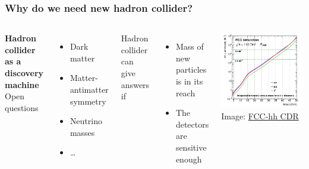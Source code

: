 \documentclass[aspectratio=169]{beamer}
\newcommand{\bluetext}[1]{%
  \textcolor{myBlue}{#1}
}
\begin{document}
\begin{frame}
  \frametitle{Why do we need new hadron collider?}

  \begin{columns}[c]

    \bluetext{{\bf Hadron collider as a discovery machine}}\\

    \bluetext{Open questions}
    \begin{itemize}
      \item Dark matter
      \item Matter-antimatter symmetry
      \item Neutrino masses
      \item \dots
    \end{itemize}
    \pause%

    \bluetext{Hadron collider can give answers if}
    \begin{itemize}
      \item Mass of new particles is in its reach
      \item The detectors are sensitive enough
    \end{itemize}


    \includegraphics[width=\linewidth]{figures/zprime-search-fcchh.png} \\
    \tiny{Image: \href{https://cds.cern.ch/record/2651300?ln=en}{FCC-hh CDR}}
  \end{columns}
\end{frame}
\end{document}
